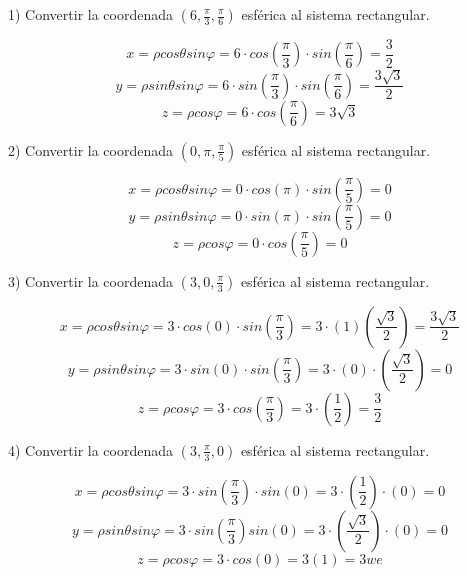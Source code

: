 1) Convertir la coordenada $(6,\frac{\pi}{3},\frac{\pi}{6})$ esférica al sistema rectangular.

\[x = \rho cos \theta sin \varphi = 6 \cdot cos \left(\frac{\pi}{3}\right) \cdot sin \left( \frac{\pi}{6} \right) = \frac{3}{2}\]
\[y = \rho sin \theta sin \varphi = 6 \cdot sin \left( \frac{\pi}{3} \right) \cdot sin \left(\frac{\pi}{6} \right) =\frac{3\sqrt{3}}{2}\]
\[z = \rho cos \varphi = 6 \cdot cos \left(\frac{\pi}{6} \right) = 3 \sqrt{3}\]

\vspace{4mm}
2) Convertir la coordenada $(0, \pi , \frac{\pi}{5})$ esférica al sistema rectangular.

\[x = \rho cos \theta sin \varphi = 0 \cdot cos (\pi) \cdot sin \left(\frac{\pi}{5}\right) = 0\]
\[y = \rho sin \theta sin \varphi = 0 \cdot sin \left(\pi \right) \cdot sin \left(\frac{\pi}{5} \right) = 0\]
\[z = \rho cos \varphi = 0 \cdot cos \left(\frac{\pi}{5} \right) = 0\]

\vspace{4mm}
3) Convertir la coordenada $\left( 3, 0, \frac{\pi}{3} \right)$ esférica al sistema rectangular.

\[x = \rho cos \theta sin \varphi = 3 \cdot cos\left( 0\right) \cdot sin \left(\frac{\pi}{3}\right) = 3 \cdot (1) \left(\frac{\sqrt{3}}{2} \right) = \frac{3\sqrt{3}}{2}\]
\[y = \rho sin \theta sin \varphi = 3 \cdot sin(0) \cdot sin \left( \frac{\pi}{3} \right) = 3 \cdot (0) \cdot \left(\frac{\sqrt{3}}{2}\right) = 0  \]
\[z = \rho cos \varphi = 3 \cdot cos \left( \frac{\pi}{3}\right) = 3 \cdot \left(\frac{1}{2}\right) =\frac{3}{2}\]

\vspace{4mm}
4) Convertir la coordenada $\left(3, \frac{\pi}{3},0\right)$ esférica al sistema rectangular.

\[x = \rho cos \theta sin \varphi = 3 \cdot sin \left(\frac{\pi}{3}\right) \cdot sin (0) =  3 \cdot \left(\frac{1}{2}\right) \cdot (0) = 0 \]
\[y = \rho sin \theta sin \varphi = 3 \cdot sin \left(\frac{\pi}{3}\right) sin (0) = 3 \cdot \left(\frac{\sqrt{3}}{2}\right) \cdot (0) = 0\]
\[z = \rho cos \varphi = 3 \cdot cos(0) = 3(1) = 3we
 \]
